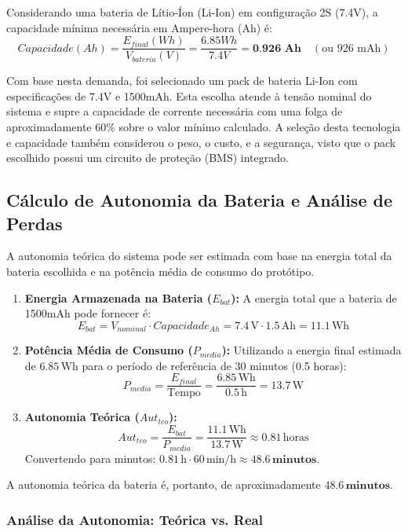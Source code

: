 Considerando uma bateria de Lítio-Íon (Li-Ion) em configuração 2S (7.4V), a capacidade mínima necessária em Ampere-hora (Ah) é:
$$ Capacidade (Ah) = \frac{E_{final} (Wh)}{V_{bateria} (V)} = \frac{6.85 Wh}{7.4V} = \textbf{0.926 Ah} \quad (\text{ou } 926 \text{ mAh}) $$

Com base nesta demanda, foi selecionado um pack de bateria Li-Ion com especificações de 7.4V e 1500mAh. Esta escolha atende à tensão nominal do sistema e supre a capacidade de corrente necessária com uma folga de aproximadamente 60\% sobre o valor mínimo calculado. A seleção desta tecnologia e capacidade também considerou o peso, o custo, e a segurança, visto que o pack escolhido possui um circuito de proteção (BMS) integrado.

\subsection{Cálculo de Autonomia da Bateria e Análise de Perdas}

A autonomia teórica do sistema pode ser estimada com base na energia total da bateria escolhida e na potência média de consumo do protótipo.

\begin{enumerate}
    \item \textbf{Energia Armazenada na Bateria ($E_{bat}$):}
    A energia total que a bateria de 1500mAh pode fornecer é:
    $$ E_{bat} = V_{nominal} \cdot Capacidade_{Ah} = 7.4\,\text{V} \cdot 1.5\,\text{Ah} = 11.1\,\text{Wh} $$

    \item \textbf{Potência Média de Consumo ($P_{media}$):}
    Utilizando a energia final estimada de $6.85\,\text{Wh}$ para o período de referência de 30 minutos (0.5 horas):
    $$ P_{media} = \frac{E_{final}}{\text{Tempo}} = \frac{6.85\,\text{Wh}}{0.5\,\text{h}} = 13.7\,\text{W} $$

    \item \textbf{Autonomia Teórica ($Aut_{teo}$):}
    $$ Aut_{teo} = \frac{E_{bat}}{P_{media}} = \frac{11.1\,\text{Wh}}{13.7\,\text{W}} \approx 0.81\,\text{horas} $$
    Convertendo para minutos: $0.81\,\text{h} \cdot 60\,\text{min/h} \approx \mathbf{48.6\,\text{minutos}}$.
\end{enumerate}

A autonomia teórica da bateria é, portanto, de aproximadamente $\mathbf{48.6\,\text{minutos}}$.

\subsubsection{Análise da Autonomia: Teórica vs. Real}

